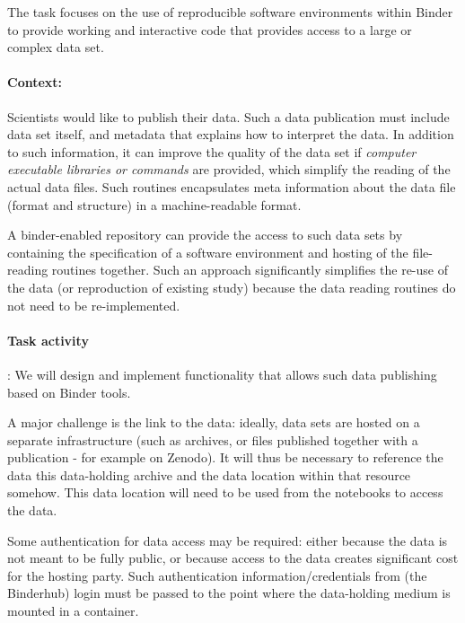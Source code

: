 \begin{task}[
  title=Data publishing,
  id=data-publishing,
  lead=MP,
  PM=1,
  wphases={0-36},
  partners={IFR, UIO}
  ]
  The task focuses on the use of reproducible software environments within
  Binder to provide working and interactive code that provides access to a large
  or complex data set.
  
  \paragraph*{Context:} Scientists would like to publish their data. Such a data
  publication must include data set itself, and metadata that explains how to
  interpret the data. In addition to such information, it can improve the
  quality of the data set if \emph{computer executable libraries or commands}
  are provided, which simplify the reading of the actual data files. Such
  routines encapsulates meta information about the data file (format and
  structure) in a machine-readable format.

  A binder-enabled repository can provide the access to such data sets by
  containing the specification of a software environment and hosting of the
  file-reading routines together. Such an approach significantly simplifies the
  re-use of the data (or reproduction of existing study) because the data
  reading routines do not need to be re-implemented.

  \paragraph*{Task activity}:
  We will design and implement functionality that allows such data publishing
  based on Binder tools. 

  A major challenge is the link to the data: ideally, data sets are hosted on a
  separate infrastructure (such as archives, or files published together with a
  publication - for example on Zenodo). It will thus be necessary to reference
  the data this data-holding archive and the data location within that resource
  somehow. This data location will need to be used from the notebooks to access
  the data. %

  Some authentication for data access may be required: either because the data
  is not meant to be fully public, or because access to the data creates
  significant cost for the hosting party. Such authentication
  information/credentials from (the Binderhub) login must be passed to the point
  where the data-holding medium is mounted in a container.


\end{task}
